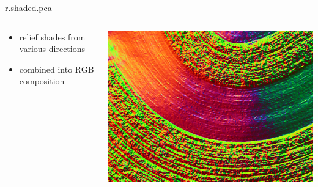 \documentclass[xcolor={dvipsnames,usenames},beamer,aspectratio=169]{beamer}
\begin{document}
\begin{frame}{r.shaded.pca}

\begin{columns}
\begin{column}{0.35\textwidth}

\begin{itemize}
  \item relief shades from various directions
  \item combined into RGB composition
\end{itemize}

\end{column}
\begin{column}{0.6\textwidth}

\begin{center}
  \includegraphics[width=\textwidth]{grass/agisoft_shadedpca100}
\end{center}

\end{column}
\end{columns}

\end{frame}
\end{document}
